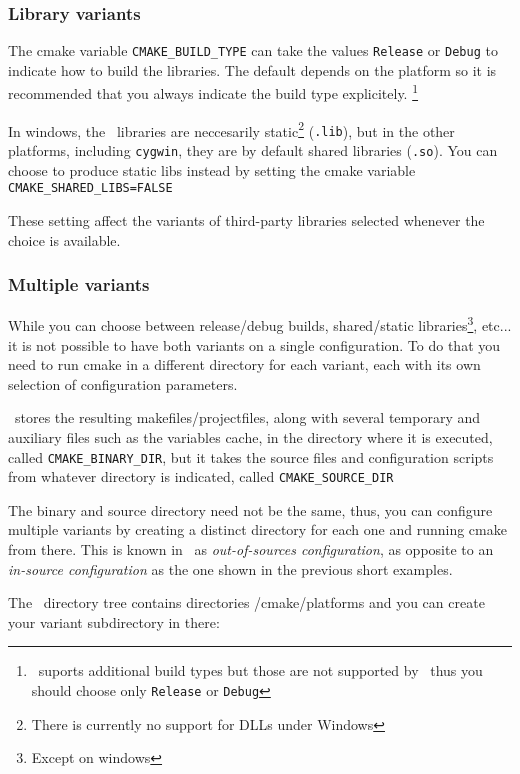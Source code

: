 \subsubsection{Library variants}

The cmake variable {\tt CMAKE\_BUILD\_TYPE} can take the values {\tt Release} or {\tt Debug} to indicate how to build
the libraries. The default depends on the platform so it is recommended that you always indicate the build type explicitely.
\footnote{\cmake\ suports additional build types but those are not supported by \cgal\, thus you should choose only
{\tt Release} or {\tt Debug}}

In windows, the \cgal\ libraries are neccesarily static\footnote{There is currently no support for DLLs under Windows}
({\tt .lib}), but in the other platforms, including {\tt cygwin}, they are by default shared libraries ({\tt .so}).
You can choose to produce static libs instead by setting the cmake variable {\tt CMAKE\_SHARED\_LIBS=FALSE} 

These setting affect the variants of third-party libraries selected whenever the choice is available.

\subsubsection{Multiple variants}\label{sec:cmake-out-of-source}

While you can choose between release/debug builds, shared/static libraries\footnote{Except on windows}, etc...
it is not possible to have both variants on a single configuration. To do that you need to run cmake in a 
different directory for each variant, each with its own selection of configuration parameters.

\cmake\ stores the resulting makefiles/projectfiles, along with several temporary and auxiliary files such
as the variables cache, in the directory where it is executed, called {\tt CMAKE\_BINARY\_DIR}, but it
takes the source files and configuration scripts from whatever directory is indicated, called
{\tt CMAKE\_SOURCE\_DIR} 

The binary and source directory need not be the same, thus, you can configure multiple variants by creating a
distinct directory for each one and running cmake from there. This is known in \cmake\ as 
{\em out-of-sources configuration}, as opposite to an {\em in-source configuration} as the one shown in the 
previous short examples.

The \cgal\ directory tree contains directories \cgaldir/cmake/platforms and you can create your 
variant subdirectory in there:

